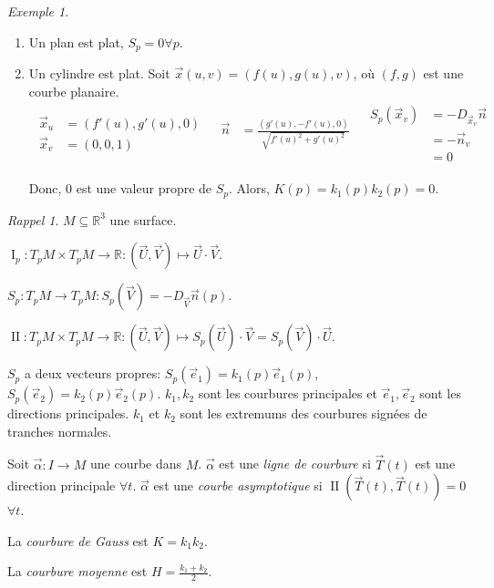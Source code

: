 \documentclass{report}
\theoremstyle{definition}
\theoremstyle{remark}
\newtheorem*{exem}{Exemple}
\newtheorem*{rapp}{Rappel}
\def\RR{\mathbb{R}}
\def\pff{\operatorname{I}}
\def\dff{\operatorname{II}}
\begin{document}
	\begin{exem}
		\begin{enumerate}
			\item Un plan est plat, $S_p=0 \forall p$.
			\item Un cylindre est plat. Soit $\vec x(u,v) = (f(u),g(u),v)$, o\`u $(f,g)$ est une courbe planaire.
			\begin{align*}
				\begin{split}
					\vec x_u&= (f'(u),g'(u),0)\\
					\vec x_v&= (0,0,1)
				\end{split}
				&
				\begin{split}
					\vec n&= \frac{(g'(u),-f'(u),0)}{\sqrt{f'(u)^2 + g'(u)^2}}
				\end{split}
				&
				\begin{split}
					S_p(\vec x_v)&= -D_{\vec x_v}\vec n\\
					&= -\vec n_v\\
					&= 0
				\end{split}
			\end{align*}

			Donc, $0$ est une valeur propre de $S_p$. Alors, $K(p)=k_1(p)k_2(p)=0$.
		\end{enumerate}
	\end{exem}

	\begin{rapp}
		$M\subseteq\RR^3$ une surface.

		$\pff_p : T_pM\times T_pM\to\RR : (\vec U,\vec V) \mapsto \vec U\cdot\vec V$.

		$S_p : T_pM\to T_pM : S_p(\vec V) = -D_{\vec V}\vec n(p)$.

		$\dff : T_pM\times T_pM\to\RR : (\vec U,\vec V) \mapsto S_p(\vec U)\cdot\vec V = S_p(\vec V)\cdot\vec U$.

		$S_p$ a deux vecteurs propres: $S_p(\vec e_1)=k_1(p)\vec e_1(p)$, $S_p(\vec e_2)=k_2(p)\vec e_2(p)$. $k_1,k_2$ sont les courbures principales et $\vec e_1,\vec e_2$ sont les directions principales. $k_1$ et $k_2$ sont les extremums des courbures sign\'ees de tranches normales.

		Soit $\vec\alpha:I\to M$ une courbe dans $M$. $\vec\alpha$ est une \emph{ligne de courbure} si $\vec T(t)$ est une direction principale $\forall t$. $\vec\alpha$ est une \emph{courbe asymptotique} si $\dff(\vec T(t), \vec T(t))=0$ $\forall t$.

		La \emph{courbure de Gauss} est $K=k_1k_2$.

		La \emph{courbure moyenne} est $H=\frac{k_1+k_2}{2}$.
	\end{rapp}
\end{document}
